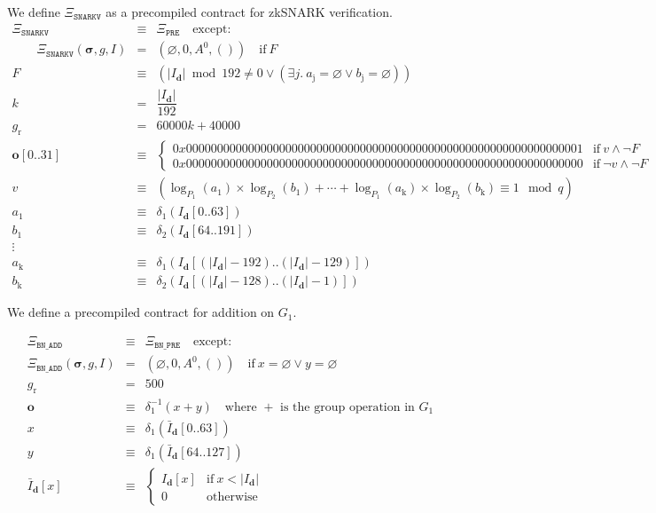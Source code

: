 \documentclass[9pt,oneside]{amsart}
\begin{document}
We define $\Xi_{\mathtt{SNARKV}}$ as a precompiled contract for zkSNARK verification.
\begin{eqnarray}
\Xi_{\mathtt{SNARKV}}&\equiv&\Xi_{\mathtt{PRE}}\quad\text{except:}\\
\qquad\Xi_{\mathtt{SNARKV}}(\boldsymbol\sigma,g,I)&=&(\varnothing,0,A^0,())\quad\text{if}\ F\\
F&\equiv&(|I_{\mathbf{d}}|\bmod 192\neq 0\vee(\exists j.\ a_{\mathrm{j}}=\varnothing\vee b_{\mathrm{j}}=\varnothing))\\
k &=& \dfrac{|I_{\mathbf{d}}|}{192} \\
g_{\mathrm{r}}&=& 60000k + 40000 \\
\mathbf o[0..31]&\equiv&\begin{cases}
0x0000000000000000000000000000000000000000000000000000000000000001&\text{if}\ v\wedge\neg F\\
0x0000000000000000000000000000000000000000000000000000000000000000&\text{if}\ \neg v\wedge\neg F
\end{cases}\\
v&\equiv&(\log_{P_1}(a_1)\times\log_{P_2}(b_1)+\cdots+\log_{P_1}(a_{\mathrm{k}})\times\log_{P_2}(b_{\mathrm{k}})\equiv 1\mod q)\\
a_1&\equiv&\delta_1(I_{\mathbf d}[0..63])\\
b_1&\equiv&\delta_2(I_{\mathbf d}[64..191])\\\nonumber
\vdots\\
a_{\mathrm{k}}&\equiv&\delta_1(I_{\mathbf d}[(|I_{\mathbf d}|-192)..(|I_{\mathbf d}|-129)])\\
b_{\mathrm{k}}&\equiv&\delta_2(I_{\mathbf d}[(|I_{\mathbf d}|-128)..(|I_{\mathbf d}|-1)])
\end{eqnarray}

We define a precompiled contract for addition on $G_1$.

\begin{eqnarray}
\Xi_{\mathtt{BN\_ADD}}&\equiv&\Xi_{\mathtt{BN\_PRE}}\quad\text{except:}\\
\Xi_{\mathtt{BN\_ADD}}(\boldsymbol\sigma,g,I)&=&(\varnothing,0,A^0,())\quad\text{if}\ x=\varnothing\vee y=\varnothing\\
g_{\mathrm{r}} &=& 500\\
\mathbf o&\equiv&\delta_1^{-1}(x+y)\quad\text{where $+$ is the group operation in $G_1$}\\
x&\equiv&\delta_1(\bar I_{\mathbf d}[0..63])\\
y&\equiv&\delta_1(\bar I_{\mathbf d}[64..127])\\
\label{eq:complemented_input}\bar I_{\mathbf d}[x]&\equiv&\begin{cases}
I_{\mathbf d}[x]&\text{if}\ x < |I_{\mathbf d}|\\
0&\text{otherwise}
\end{cases}
\end{eqnarray}
\end{document}
